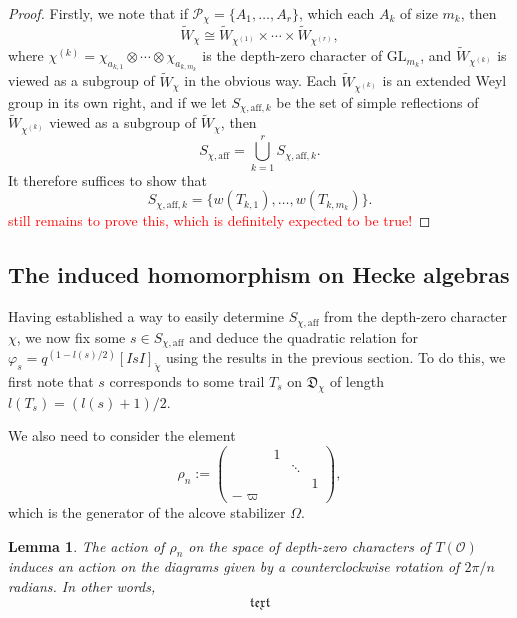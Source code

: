 \documentclass{article}
\newcommand{\GL}{\mathrm{GL}}
\newcommand{\aff}{\mathrm{aff}}
\newcommand{\cO}{\mathcal{O}}
\theoremstyle{plain}
\newtheorem{lemma}[theorem]{Lemma}
\theoremstyle{definition}
\begin{document}
    \begin{proof}
        Firstly, we note that if $\mathcal{P}_\chi=\{A_1,\ldots,A_r\}$, which each $A_k$ of size $m_k$, then 
        $$\widetilde{W}_\chi\cong \widetilde{W}_{\chi^{(1)}}\times\cdots\times\widetilde{W}_{\chi^{(r)}},$$
        where $\chi^{(k)}=\chi_{a_{k,1}}\otimes\cdots\otimes\chi_{a_{k,m_k}}$ is the depth-zero character of $\GL_{m_k}$, and $\widetilde{W}_{\chi^{(k)}}$ is viewed as a subgroup of $\widetilde{W}_{\chi}$ in the obvious way. Each $\widetilde{W}_{\chi^{(k)}}$ is an extended Weyl group in its own right, and if we let $S_{\chi,\aff,k}$ be the set of simple reflections of $\widetilde{W}_{\chi^{(k)}}$ viewed as a subgroup of $\widetilde{W}_{\chi}$, then 
        $$S_{\chi,\aff}=\bigcup_{k=1}^r S_{\chi,\aff,k}.$$
        It therefore suffices to show that 
        $$S_{\chi,\aff,k}=\{w(T_{k,1}),\ldots,w(T_{k,m_k})\}.$$
        \textcolor{red}{still remains to prove this, which is definitely expected to be true!}
    \end{proof}
        
    \subsection{The induced homomorphism on Hecke algebras}

    Having established a way to easily determine $S_{\chi,\aff}$ from the depth-zero character $\chi$, we now fix some $s\in S_{\chi,\aff}$ and deduce the quadratic relation for $\varphi_s=q^{(1-l(s)/2)}[IsI]_{\check{\chi}}$ using the results in the previous section. To do this, we first note that $s$ corresponds to some trail $T_s$ on $\mathfrak{D}_\chi$ of length $l(T_s)=(l(s)+1)/2$. 

    We also need to consider the element 
    \begin{equation*}
        \rho_n:=
        \begin{pmatrix}
            &1&& \\
            &&\ddots& \\
            &&&1 \\
            -\varpi&&& 
        \end{pmatrix},
    \end{equation*}
    which is the generator of the alcove stabilizer $\Omega$.

    \begin{lemma}
        The action of $\rho_n$ on the space of depth-zero characters of $T(\cO)$ induces an action on the diagrams given by a counterclockwise rotation of $2\pi/n$ radians. In other words, 
        $$\mathfrak{text}$$
    \end{lemma}
\end{document}
